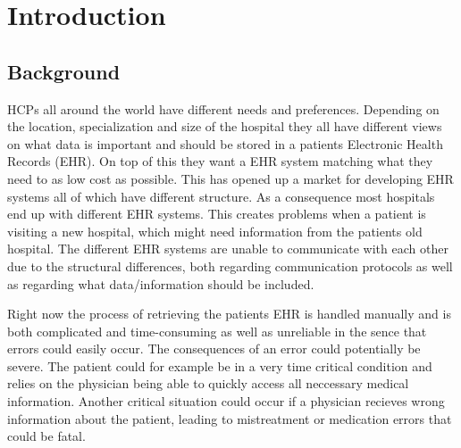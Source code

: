 \documentclass[14pt]{article}
\begin{document}
\section{Introduction}
\label{sec:Introduction}

\subsection{Background}

\glspl{HCP} all around the world have different needs and preferences. Depending on the location, specialization and size of the hospital they all have different views on what data is important and should be stored in a patients Electronic Health Records (\gls{EHR}). On top of this they want a \gls{EHR} system matching what they need to as low cost as possible. This has opened up a market for developing \gls{EHR} systems all of which have different structure. As a consequence most hospitals end up with different \gls{EHR} systems. This creates problems when a patient is visiting a new hospital, which might need information from the patients old hospital. The different \gls{EHR} systems are unable to communicate with each other due to the structural differences, both regarding communication protocols as well as regarding what data/information should be included. 

Right now the process of retrieving the patients \gls{EHR} is handled manually \cite{DataInsp} 
and is both complicated and time-consuming as well as unreliable in the sence that errors could easily occur. The consequences of an error could potentially be severe. The patient could for example be in a very time critical condition and relies on the physician being able to quickly access all neccessary medical information. Another critical situation could occur if a physician recieves wrong information about the patient, leading to mistreatment or medication errors that could be fatal.
\end{document}

